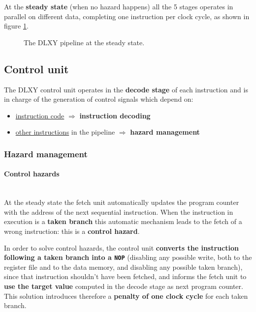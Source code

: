 At the \textbf{steady state} (when no hazard happens) all the 5 stages operates
in parallel on different data, completing one instruction per clock cycle, as
shown in figure \ref{fig:pipeline_steady}.
\begin{figure}[H]
	\centering
	\caption{The DLXY pipeline at the steady state.}
	\label{fig:pipeline_steady}
\end{figure}

\subsection{Control unit}
The DLXY control unit operates in the \textbf{decode stage} of each instruction
and is in charge of the generation of control signals which depend on:
\begin{itemize}
	\item \underline{instruction code} $\Rightarrow$ \textbf{instruction decoding}
	\item \underline{other instructions} in the pipeline $\Rightarrow$
		\textbf{hazard management}
\end{itemize}

\subsubsection{Hazard management}

\paragraph{Control hazards} \mbox{} \\
At the steady state the fetch unit automatically updates the program counter
with the address of the next sequential instruction.
When the instruction in execution is a \textbf{taken branch} this automatic
mechanism leads to the fetch of a wrong instruction: this is a
\textbf{control hazard}.

\bigskip
In order to solve control hazards, the control unit \textbf{converts
the instruction following a taken branch into a \texttt{NOP}} (disabling any
possible write, both to the register file and to the data memory, and disabling
any possible taken branch), since that instruction shouldn't have been fetched,
and informs the fetch unit to \textbf{use the target value} computed in the
decode stage as next program counter. This solution introduces therefore a
\textbf{penalty of one clock cycle} for each taken branch.

